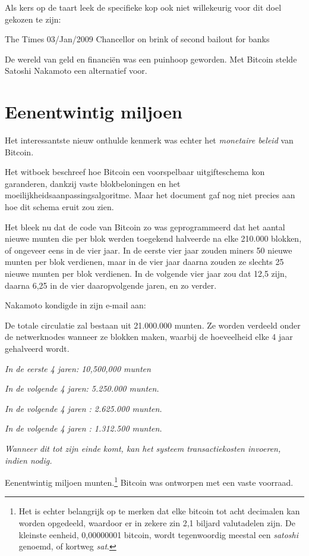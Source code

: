 \documentclass[
  a5paper,
  smalldemyvopaper,11pt,twoside,onecolumn,openright,extrafontsizes,
hidelinks]{memoir}
\renewenvironment{quote}%
               {\list{}{\rightmargin=.3cm\leftmargin=.3cm}%
                \itshape \item[]}%
               {\endlist}
\begin{document}
Als kers op de taart leek de specifieke kop ook niet willekeurig voor
dit doel gekozen te zijn:

\begin{quote}
The Times 03/Jan/2009 Chancellor on brink of second bailout for banks
\end{quote}

De wereld van geld en financiën was een puinhoop geworden. Met Bitcoin
stelde Satoshi Nakamoto een alternatief voor.

\section{Eenentwintig miljoen}\label{eenentwintig-miljoen}

Het interessantste nieuw onthulde kenmerk was echter het \emph{monetaire
beleid} van Bitcoin.

Het witboek beschreef hoe Bitcoin een voorspelbaar uitgifteschema kon
garanderen, dankzij vaste blokbeloningen en het
moeilijkheidsaanpassingsalgoritme. Maar het document gaf nog niet
precies aan hoe dit schema eruit zou zien.

Het bleek nu dat de code van Bitcoin zo was geprogrammeerd dat het
aantal nieuwe munten die per blok werden toegekend halveerde na elke
210.000 blokken, of ongeveer eens in de vier jaar. In de eerste vier
jaar zouden miners 50 nieuwe munten per blok verdienen, maar in de vier
jaar daarna zouden ze slechts 25 nieuwe munten per blok verdienen. In de
volgende vier jaar zou dat 12,5 zijn, daarna 6,25 in de vier
daaropvolgende jaren, en zo verder.

Nakamoto kondigde in zijn e-mail aan:

De totale circulatie zal bestaan uit 21.000.000 munten. Ze worden
verdeeld onder de netwerknodes wanneer ze blokken maken, waarbij de
hoeveelheid elke 4 jaar gehalveerd wordt.

\emph{In de eerste 4 jaren: 10,500,000 munten}

\emph{In de volgende 4 jaren: 5.250.000 munten.}

\emph{In de volgende 4 jaren : 2.625.000 munten.}

\emph{In de volgende 4 jaren : 1.312.500 munten.}

\emph{Wanneer dit tot zijn einde komt, kan het systeem transactiekosten
invoeren, indien nodig.}

Eenentwintig miljoen munten.\footnote{Het is echter belangrijk op te
  merken dat elke bitcoin tot acht decimalen kan worden opgedeeld,
  waardoor er in zekere zin 2,1 biljard valutadelen zijn. De kleinste
  eenheid, 0,00000001 bitcoin, wordt tegenwoordig meestal een
  \emph{satoshi} genoemd, of kortweg \emph{sat}.} Bitcoin was ontworpen
met een vaste voorraad.
\end{document}
